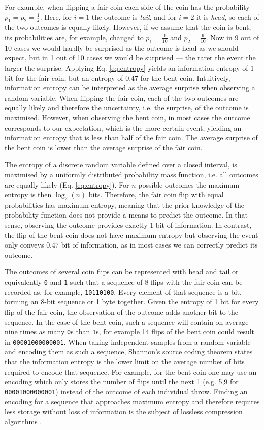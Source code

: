 For example, when flipping a fair coin each side of the coin has the probability $p_1=p_2=\tfrac{1}{2}$. Here, for
$i=1$ the outcome is \emph{tail}, and for $i=2$ it is \emph{head}, so each of the two outcomes is equally likely. 
However, if we assume that the coin is bent, its probabilities are, for example, changed to $p_1 = \tfrac{1}{10}$ and
$p_2 = \tfrac{9}{10}$. Now in 9 out of 10 cases we would hardly be surprised as the outcome is head as we should expect,
but in 1 out of 10 cases we would be surprised --- the rarer the event the larger the surprise. Applying Eq. \ref{eq:entropy} yields
an information entropy of 1 bit for the fair coin, but an entropy of $0.47$ for the bent coin. Intuitively, information entropy can
be interpreted as the average surprise when observing a random variable. When flipping the fair coin, each of the two outcomes
are equally likely and therefore the uncertainty, i.e. the surprise, of the outcome is maximised. However, when observing the bent coin,
in most cases the outcome corresponds to our expectation, which is the more certain event, yielding an information entropy that is less
than half of the fair coin. The average surprise of the bent coin is lower than the average surprise of the fair coin. 

The entropy of a discrete random variable defined over a closed interval, is maximised by a uniformly distributed probability
mass function, i.e. all outcomes are equally likely (Eq. \ref{eq:entropy}). For $n$ possible outcomes the maximum entropy is then
$\log_2(n)$ bits. Therefore, the fair coin flip with equal probabilities has maximum entropy, meaning that the prior knowledge of the
probability function does not provide a means to predict the outcome. In that sense, observing the outcome provides exactly 1 bit of
information. In contrast, the flip of the bent coin does not have maximum entropy but observing the event only conveys $0.47$ bit of
information, as in most cases we can correctly predict its outcome.

The outcomes of several coin flips can be represented with head and tail or equivalently \texttt{0} and \texttt{1} such that a sequence
of 8 flips with the fair coin can be recorded as, for example, \texttt{10110100}. Every element of that sequence is a bit, forming an
8-bit sequence or 1 byte together. Given the entropy of 1 bit for every flip of the fair coin, the observation
of the outcome adds another bit to the sequence. In the case of the bent coin, such a sequence will contain on average nine times
as many \texttt{0}s than \texttt{1}s, for example 14 flips of the bent coin could result in \texttt{00001000000001}.
When taking independent samples from a random variable and encoding them as such a sequence, Shannon's source coding theorem
\citep{Shannon1948} states that the information entropy is the lower limit on the average number of bits required to encode that sequence.
For example, for the bent coin one may use an encoding which only stores the number of flips until the next 1 (e.g. 5,9 for \texttt{00001000000001})
instead of the outcome of each individual throw. Finding an encoding for a sequence that approaches maximum entropy and therefore requires
less storage without loss of information is the subject of lossless compression algorithms \citep{MacKay2003}.

